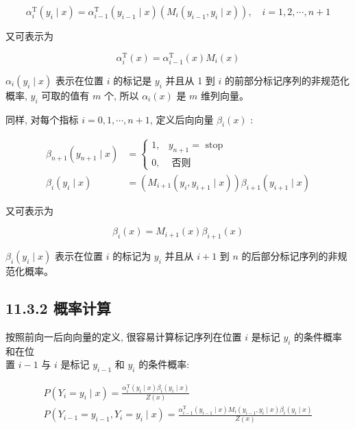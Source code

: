 \documentclass[10pt]{article}
\begin{document}
\begin{CJK*}{UTF8}{bsmi}
\begin{equation*}
\alpha_{i}^{\mathrm{T}}\left(y_{i} \mid x\right)=\alpha_{i-1}^{\mathrm{T}}\left(y_{i-1} \mid x\right)\left(M_{i}\left(y_{i-1}, y_{i} \mid x\right)\right), \quad i=1,2, \cdots, n+1 \tag{11.27}
\end{equation*}


又可表示为


\begin{equation*}
\alpha_{i}^{\mathrm{T}}(x)=\alpha_{i-1}^{\mathrm{T}}(x) M_{i}(x) \tag{11.28}
\end{equation*}


$\alpha_{i}\left(y_{i} \mid x\right)$ 表示在位置 $i$ 的标记是 $y_{i}$ 并且从 1 到 $i$ 的前部分标记序列的非规范化概率, $y_{i}$ 可取的值有 $m$ 个, 所以 $\alpha_{i}(x)$ 是 $m$ 维列向量。

同样, 对每个指标 $i=0,1, \cdots, n+1$, 定义后向向量 $\beta_{i}(x)$ :


\begin{align*}
\beta_{n+1}\left(y_{n+1} \mid x\right) & = \begin{cases}1, & y_{n+1}=\text { stop } \\
0, & \text { 否则 }\end{cases}  \tag{11.29}\\
\beta_{i}\left(y_{i} \mid x\right) & =\left(M_{i+1}\left(y_{i}, y_{i+1} \mid x\right)\right) \beta_{i+1}\left(y_{i+1} \mid x\right) \tag{11.30}
\end{align*}


又可表示为


\begin{equation*}
\beta_{i}(x)=M_{i+1}(x) \beta_{i+1}(x) \tag{11.31}
\end{equation*}


$\beta_{i}\left(y_{i} \mid x\right)$ 表示在位置 $i$ 的标记为 $y_{i}$ 并且从 $i+1$ 到 $n$ 的后部分标记序列的非规范化概率。

\subsection*{11.3.2 概率计算}
按照前向一后向向量的定义, 很容易计算标记序列在位置 $i$ 是标记 $y_{i}$ 的条件概率和在位\\
置 $i-1$ 与 $i$ 是标记 $y_{i-1}$ 和 $y_{i}$ 的条件概率:


\begin{gather*}
P\left(Y_{i}=y_{i} \mid x\right)=\frac{\alpha_{i}^{\mathrm{T}}\left(y_{i} \mid x\right) \beta_{i}\left(y_{i} \mid x\right)}{Z(x)}  \tag{11.32}\\
P\left(Y_{i-1}=y_{i-1}, Y_{i}=y_{i} \mid x\right)=\frac{\alpha_{i-1}^{\mathrm{T}}\left(y_{i-1} \mid x\right) M_{i}\left(y_{i-1}, y_{i} \mid x\right) \beta_{i}\left(y_{i} \mid x\right)}{Z(x)} \tag{11.33}
\end{gather*}



\end{CJK*}
\end{document}
